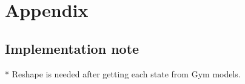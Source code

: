 \documentclass{article}
\begin{document}
    \section*{Appendix}

    \subsection{Implementation note}
    * Reshape is needed after getting each state from Gym models.


    
    




\end{document}
